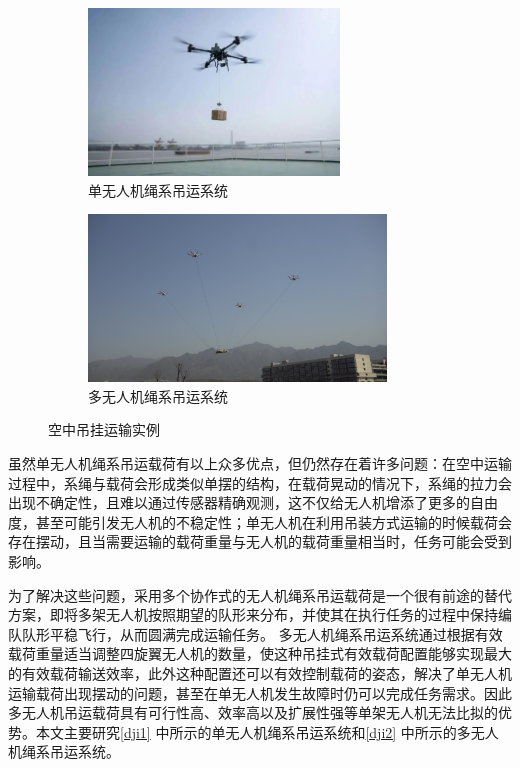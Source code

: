 \documentclass[lang=chs, degree=master, blindreview=false, winfonts=true]{yanputhesis}
\begin{document}
\begin{figure}[htb!]
    \centering
	\hspace{-1.0cm}
    \begin{minipage}[t]{0.96\textwidth}
        \centering
        \begin{subfigure}[t]{0.47\textwidth}
            \centering
            \includegraphics[height = 1.75in]{picture/dji1.jpg}
            \caption{单无人机绳系吊运系统\label{dji1}}
        \end{subfigure}\hfill
        \begin{subfigure}[t]{0.47\textwidth}
            \centering
            \includegraphics[height = 1.75in]{picture/dji2.png}
            \caption{多无人机绳系吊运系统\label{dji2}}
        \end{subfigure}
    \end{minipage}
    \caption{空中吊挂运输实例}
\end{figure}
虽然单无人机绳系吊运载荷有以上众多优点，但仍然存在着许多问题：在空中运输过程中，系绳与载荷会形成类似单摆的结构，在载荷晃动的情况下，系绳的拉力会出现不确定性，且难以通过传感器精确观测，这不仅给无人机增添了更多的自由度，甚至可能引发无人机的不稳定性；单无人机在利用吊装方式运输的时候载荷会存在摆动，且当需要运输的载荷重量与无人机的载荷重量相当时，任务可能会受到影响。

为了解决这些问题，采用多个协作式的无人机绳系吊运载荷是一个很有前途的替代方案，即将多架无人机按照期望的队形来分布，并使其在执行任务的过程中保持编队队形平稳飞行，从而圆满完成运输任务。
多无人机绳系吊运系统通过根据有效载荷重量适当调整四旋翼无人机的数量，使这种吊挂式有效载荷配置能够实现最大的有效载荷输送效率，此外这种配置还可以有效控制载荷的姿态，解决了单无人机运输载荷出现摆动的问题，甚至在单无人机发生故障时仍可以完成任务需求。因此多无人机吊运载荷具有可行性高、效率高以及扩展性强等单架无人机无法比拟的优势。本文主要研究\autoref{dji1} 中所示的单无人机绳系吊运系统和\autoref{dji2} 中所示的多无人机绳系吊运系统。
\end{document}
